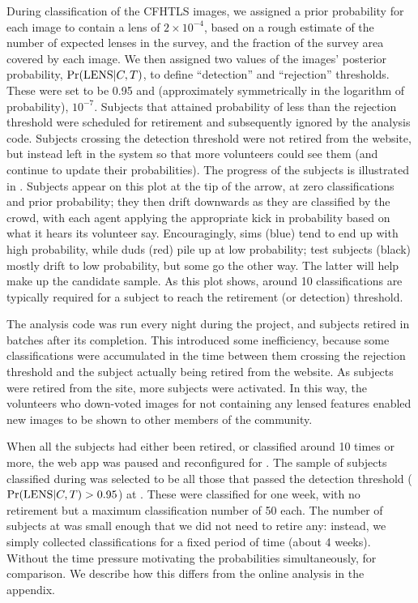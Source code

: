 \documentclass[useAMS,usenatbib,a4paper]{mn2e}
\begin{document}
During \StageOne classification of the CFHTLS images, we assigned a prior
probability for each image to contain a lens of $2\times10^{-4}$, based on a
rough estimate of the number of expected lenses in the survey, and the fraction
of the survey area covered by each image. We then assigned two values of the
images' posterior probability, ${\rm Pr}({\rm LENS}|C,T)$, to define ``detection'' and
``rejection'' thresholds. These were set to be 0.95 and (approximately
symmetrically in the logarithm of probability), $10^{-7}$. Subjects that
attained probability of less than the rejection threshold were scheduled for
retirement and subsequently ignored by the analysis code. Subjects crossing the
detection threshold were not retired from the website, but instead left in the
system so that more volunteers could see them (and continue to update their
probabilities). The progress of the subjects is illustrated in
. Subjects appear on this plot at the tip of
the arrow, at zero classifications and prior probability; they then drift
downwards as they are classified by the crowd, with each agent applying the
appropriate kick in probability based on what it hears its volunteer say.
Encouragingly, sims (blue) tend to end up with high probability, while duds
(red) pile up at low probability; test subjects (black) mostly drift to low
probability, but some go the other way. The latter will help make up the
candidate sample. As this plot shows, around 10 classifications are typically required for a subject to reach the retirement (or detection) threshold.

The analysis code was run every night during the project, and subjects retired
in batches after its completion. This introduced some inefficiency, because
some classifications were accumulated in the time between them crossing the
rejection threshold and the subject actually being retired from the website.
As subjects were retired from the site, more subjects were activated. In this
way, the volunteers who down-voted images for not containing any lensed
features enabled new images to be shown to other members of the community.

When all the subjects had either been retired, or classified around 10 times
or more, the web app was paused and reconfigured for \StageTwo. The sample of
subjects classified during \StageTwo was selected to be all those that passed
the detection threshold (${\rm Pr}({\rm LENS}|C,T) > 0.95$) at \StageOne. These were
classified for one week, with no retirement but a maximum classification
number of 50 each. The number of subjects at \StageTwo was small enough that we
did not need to retire any: instead, we simply collected classifications for a
fixed period of time (about 4 weeks). Without the time pressure motivating the
probabilities simultaneously, for comparison. We describe how this differs
from the online analysis in the appendix.
\end{document}
